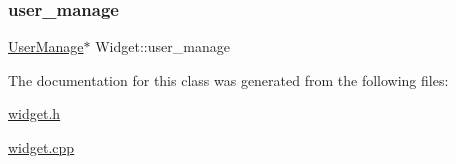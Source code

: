 \mbox{\label{class_widget_ab5466d1d1f1c9e475eb86b2644af7e4b}} 
\subsubsection{\texorpdfstring{user\_manage}{user\_manage}}
{\footnotesize\ttfamily \mbox{\hyperlink{class_user_manage}{User\+Manage}}$\ast$ Widget\+::user\+\_\+manage\hspace{0.3cm}{\ttfamily [private]}}



The documentation for this class was generated from the following files\+:\begin{DoxyCompactItemize}
\item 
\mbox{\hyperlink{widget_8h}{widget.\+h}}\item 
\mbox{\hyperlink{widget_8cpp}{widget.\+cpp}}\end{DoxyCompactItemize}
